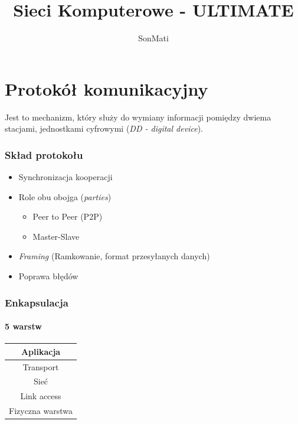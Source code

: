 \documentclass[a4paper,twoside]{article}
\begin{document}




\begin{titlepage}
\title{\huge Sieci Komputerowe - ULTIMATE}
\author{\large SonMati}
\maketitle
\end{titlepage}

\newpage

\part{Protokół komunikacyjny}
Jest to mechanizm, który służy do wymiany informacji pomiędzy dwiema stacjami, jednostkami cyfrowymi (\emph{DD - digital device}). 
\section{Skład protokołu}
\begin{itemize}
	\item Synchronizacja kooperacji
	\item Role obu obojga (\emph{parties})
	\begin{itemize}
		\item Peer to Peer (P2P)
		\item Master-Slave
	\end{itemize}
	\item \emph{Framing} (Ramkowanie, format przesyłanych danych)
	\item Poprawa błędów
\end{itemize}
\section{Enkapsulacja}
	\subsection{5 warstw}
	\begin{table}[h]
		\begin{tabular}{|c|}
			\hline
			Aplikacja        \\ \hline
			Transport        \\ \hline
			Sieć             \\ \hline
			Link access      \\ \hline
			Fizyczna warstwa \\ \hline
		\end{tabular}
	\end{table}
\end{document}
